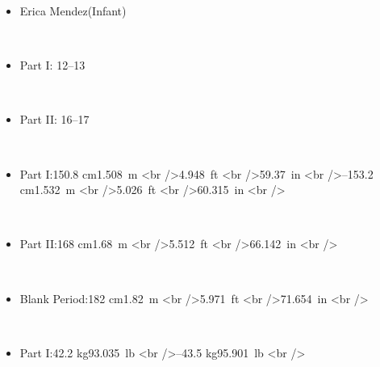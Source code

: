 \documentclass[a4paper,12pt]{article}
\begin{document}
\begin{itemize}
\item Erica Mendez(Infant)
\end{itemize}\\ \par \vspace{0.5cm}

\begin{itemize}
\item Part I: 12–13
\end{itemize}\\ \par \vspace{0.5cm}

\begin{itemize}
\item Part II: 16–17
\end{itemize}\\ \par \vspace{0.5cm}

\begin{itemize}
\item Part I:150.8  cm1.508 m <br />4.948 ft <br />59.37 in <br />–153.2  cm1.532 m <br />5.026 ft <br />60.315 in <br />
\end{itemize}\\ \par \vspace{0.5cm}

\begin{itemize}
\item Part II:168  cm1.68 m <br />5.512 ft <br />66.142 in <br />
\end{itemize}\\ \par \vspace{0.5cm}

\begin{itemize}
\item Blank Period:182  cm1.82 m <br />5.971 ft <br />71.654 in <br />
\end{itemize}\\ \par \vspace{0.5cm}

\begin{itemize}
\item Part I:42.2  kg93.035 lb <br />–43.5  kg95.901 lb <br />
\end{itemize}\\ \par \vspace{0.5cm}
\end{document}
